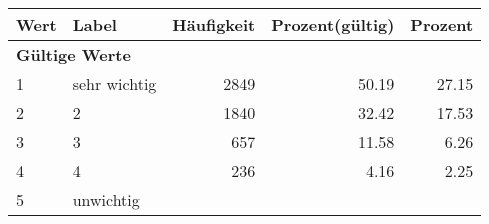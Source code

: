      \begin{longtable}{lXrrr}
     \toprule
     \textbf{Wert} & \textbf{Label} & \textbf{Häufigkeit} & \textbf{Prozent(gültig)} & \textbf{Prozent} \\
     \endhead
     \midrule
     \multicolumn{5}{l}{\textbf{Gültige Werte}}\\

     1 &
     \multicolumn{1}{X}{ sehr wichtig   } &


       \num{2849} &
       \num[round-mode=places,round-precision=2]{50,19} &
         \num[round-mode=places,round-precision=2]{27,15} \\

     2 &
     \multicolumn{1}{X}{ 2   } &


       \num{1840} &
       \num[round-mode=places,round-precision=2]{32,42} &
         \num[round-mode=places,round-precision=2]{17,53} \\

     3 &
     \multicolumn{1}{X}{ 3   } &


       \num{657} &
       \num[round-mode=places,round-precision=2]{11,58} &
         \num[round-mode=places,round-precision=2]{6,26} \\

     4 &
     \multicolumn{1}{X}{ 4   } &


       \num{236} &
       \num[round-mode=places,round-precision=2]{4,16} &
         \num[round-mode=places,round-precision=2]{2,25} \\

     5 &
     \multicolumn{1}{X}{ unwichtig   } &



\end{longtable}
